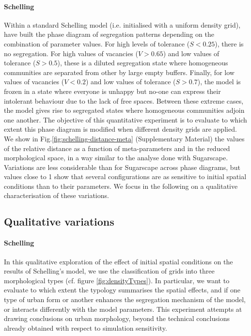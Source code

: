 \documentclass[3p,times,procedia]{elsarticle}
\begin{document}
\paragraph{Schelling} 
Within a standard Schelling model (i.e. initialised with a uniform density grid), \citet{Gauvinetal2009} have built the phase diagram of segregation patterns depending on the combination of parameter values. For high levels of tolerance ($S < 0.25$), there is no segregation. For high values of vacancies ($V > 0.65$) and low values of tolerance ($S > 0.5$), these is a diluted segregation state where homogeneous communities are separated from other by large empty buffers. Finally, for low values of vacancies ($V < 0.2$) and low values of tolerance ($S > 0.7$), the model is frozen in a state where everyone is unhappy but no-one can express their intolerant behaviour due to the lack of free spaces. Between these extreme cases, the model gives rise to segregated states where homogeneous communities adjoin one another. The objective of this quantitative experiment is to evaluate to which extent this phase diagram is modified when different density grids are applied. We show in Fig.\ref{fig:schelling-distance-meta} (Supplementary Material) the values of the relative distance as a function of meta-parameters and in the reduced morphological space, in a way similar to the analyse done with Sugarscape. Variations are less considerable than for Sugarscape across phase diagrams, but values close to 1 show that several configurations are as sensitive to initial spatial conditions than to their parameters. We focus in the following on a qualitative characterisation of these variations.

\subsection{Qualitative variations}
\label{sec:qualResults}

\paragraph{Schelling}

In this qualitative exploration of the effect of initial spatial conditions on the results of Schelling's model, we use the classification of grids into three morphological types (cf. figure \ref{fig:densityTypes}). In particular, we want to evaluate to which extent the typology summarises the spatial effects, and if one type of urban form or another enhances the segregation mechanism of the model, or interacts differently with the model parameters. This experiment attempts at drawing conclusions on urban morphology, beyond the technical conclusions already obtained with respect to simulation sensitivity.
\end{document}
